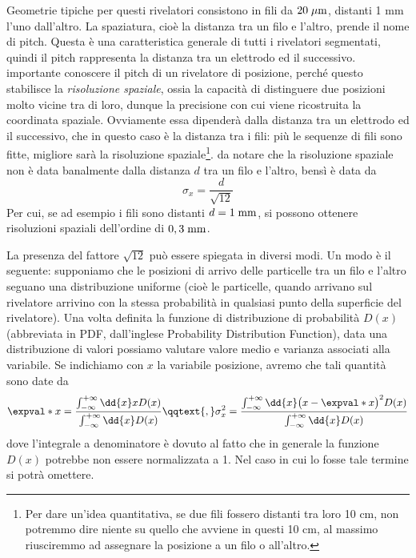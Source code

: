 Geometrie tipiche per questi rivelatori consistono in fili da $20 \; \rm \mu m$, distanti 1 mm l'uno dall'altro. La spaziatura, cioè la distanza tra un filo e l'altro, prende il nome di pitch. Questa è una caratteristica generale di tutti i rivelatori segmentati, quindi il pitch rappresenta la distanza tra un elettrodo ed il successivo. \E importante conoscere il pitch di un rivelatore di posizione, perché questo stabilisce la \textit{risoluzione spaziale}, ossia la capacità di distinguere due posizioni molto vicine tra di loro, dunque la precisione con cui viene ricostruita la coordinata spaziale. Ovviamente essa dipenderà dalla distanza tra un elettrodo ed il successivo, che in questo caso è la distanza tra i fili: più le sequenze di fili sono fitte, migliore sarà la risoluzione spaziale\footnote{Per dare un'idea quantitativa, se due fili fossero distanti tra loro 10 cm, non potremmo dire niente su quello che avviene in questi 10 cm, al massimo riusciremmo ad assegnare la posizione a un filo o all'altro.}. \E da notare che la risoluzione spaziale non è data banalmente dalla distanza $d$ tra un filo e l'altro, bensì è data da
\begin{equation*}
   \sigma_x=\frac{d}{\sqrt{12}}
\end{equation*}
Per cui, se ad esempio i fili sono distanti $d=1 \; \rm mm$, si possono ottenere risoluzioni spaziali dell'ordine di $0,3 \; \rm mm$.

La presenza del fattore $\sqrt{12}$ può essere spiegata in diversi modi. Un modo è il seguente: supponiamo che le posizioni di arrivo delle particelle tra un filo e l'altro seguano una distribuzione uniforme (cioè le particelle, quando arrivano sul rivelatore arrivino con la stessa probabilità in qualsiasi punto della superficie del rivelatore). Una volta definita la funzione di distribuzione di probabilità $D(x)$ (abbreviata in PDF, dall'inglese Probability Distribution Function), data una distribuzione di valori possiamo valutare valore medio e varianza associati alla variabile. Se indichiamo con $x$ la variabile posizione, avremo che tali quantità sono date da
\begin{equation*}
   \expval*{x}
   =\frac{\int_{-\infty}^{+\infty} \dd{x} x D(x)}{\int_{-\infty}^{+\infty} \dd{x} D(x)}
   \qqtext{,}
   \sigma_x^2
   =\frac{\int_{-\infty}^{+\infty} \dd{x} \bigl( x - \expval*{x} \bigr)^2 D(x)}{\int_{-\infty}^{+\infty} \dd{x} D(x)}
\end{equation*}
dove l'integrale a denominatore è dovuto al fatto che in generale la funzione $D(x)$ potrebbe non essere normalizzata a 1. Nel caso in cui lo fosse tale termine si potrà omettere.

